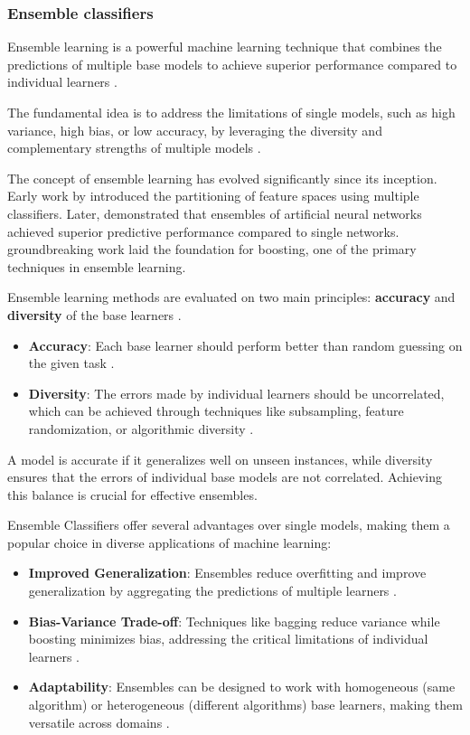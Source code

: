 \subsubsection{Ensemble classifiers}

Ensemble learning is a powerful machine learning technique that combines the predictions of multiple base models to achieve superior performance compared to individual learners \parencite{Joseph2022}.

The fundamental idea is to address the limitations of single models, such as high variance, high bias, or low accuracy, by leveraging the diversity and complementary strengths of multiple models \parencite{Mienye2022, Dasarathy1979, Hansen1990}.

The concept of ensemble learning has evolved significantly since its inception. Early work by \textcite{Dasarathy1979} introduced the partitioning of feature spaces using multiple classifiers. 
Later, \textcite{Hansen1990} demonstrated that ensembles of artificial neural networks achieved superior predictive performance compared to single networks. 
\textcite{Schapire1990} groundbreaking work laid the foundation for boosting, one of the primary techniques in ensemble learning.

Ensemble learning methods are evaluated on two main principles: \textbf{accuracy} and \textbf{diversity} of the base learners \parencite{Hansen1990, Mienye2022}.

\begin{itemize}
    \item \textbf{Accuracy}: Each base learner should perform better than random guessing on the given task \parencite{Li2012}.
    \item \textbf{Diversity}: The errors made by individual learners should be uncorrelated, which can be achieved through techniques like subsampling, feature randomization, or algorithmic diversity \parencite{Schapire1990, Breiman1996}.
\end{itemize}

A model is accurate if it generalizes well on unseen instances, while diversity ensures that the errors of individual base models are not correlated. 
Achieving this balance is crucial for effective ensembles.

Ensemble Classifiers offer several advantages over single models, making them a popular choice in diverse applications of machine learning:
\begin{itemize}
    \item \textbf{Improved Generalization}: Ensembles reduce overfitting and improve generalization by aggregating the predictions of multiple learners \parencite{Hansen1990}.
    \item \textbf{Bias-Variance Trade-off}: Techniques like bagging reduce variance while boosting minimizes bias, addressing the critical limitations of individual learners \parencite{Li2012, Mienye2022}.
    \item \textbf{Adaptability}: Ensembles can be designed to work with homogeneous (same algorithm) or heterogeneous (different algorithms) base learners, making them versatile across domains \parencite{Mienye2022}.
\end{itemize}

